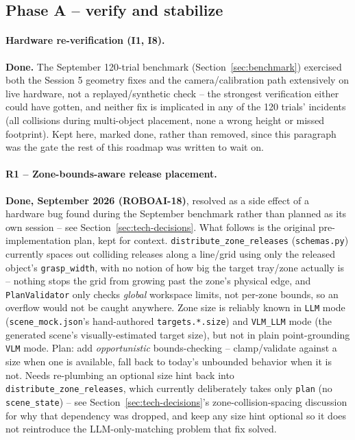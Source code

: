 \subsection{Phase A -- verify and stabilize}

\paragraph{Hardware re-verification (I1, I8).} \textbf{Done.} The September
120-trial benchmark (Section~\ref{sec:benchmark}) exercised both the
Session 5 geometry fixes and the camera/calibration path extensively on
live hardware, not a replayed/synthetic check -- the strongest verification
either could have gotten, and neither fix is implicated in any of the
120 trials' incidents (all collisions during multi-object placement, none
a wrong height or missed footprint). Kept here, marked done, rather than
removed, since this paragraph was the gate the rest of this roadmap was
written to wait on.

\paragraph{R1 -- Zone-bounds-aware release placement.} \textbf{Done,
September 2026 (ROBOAI-18)}, resolved as a side effect of a hardware bug
found during the September benchmark rather than planned as its own session
-- see Section~\ref{sec:tech-decisions}. What follows is the original
pre-implementation plan, kept for context.
\texttt{distribute\_zone\_releases} (\texttt{schemas.py}) currently spaces
out colliding releases along a line/grid using only the released object's
\texttt{grasp\_width}, with no notion of how big the target tray/zone
actually is -- nothing stops the grid from growing past the zone's physical
edge, and \texttt{PlanValidator} only checks \emph{global} workspace limits,
not per-zone bounds, so an overflow would not be caught anywhere. Zone size
is reliably known in \texttt{LLM} mode (\texttt{scene\_mock.json}'s
hand-authored \texttt{targets.*.size}) and \texttt{VLM\_LLM} mode (the
generated scene's visually-estimated target size), but not in plain
point-grounding \texttt{VLM} mode. Plan: add \emph{opportunistic}
bounds-checking -- clamp/validate against a size when one is available, fall
back to today's unbounded behavior when it is not. Needs re-plumbing an
optional size hint back into \texttt{distribute\_zone\_releases}, which
currently deliberately takes only \texttt{plan} (no \texttt{scene\_state}) --
see Section~\ref{sec:tech-decisions}'s zone-collision-spacing discussion for
why that dependency was dropped, and keep any size hint optional so it does
not reintroduce the LLM-only-matching problem that fix solved.

